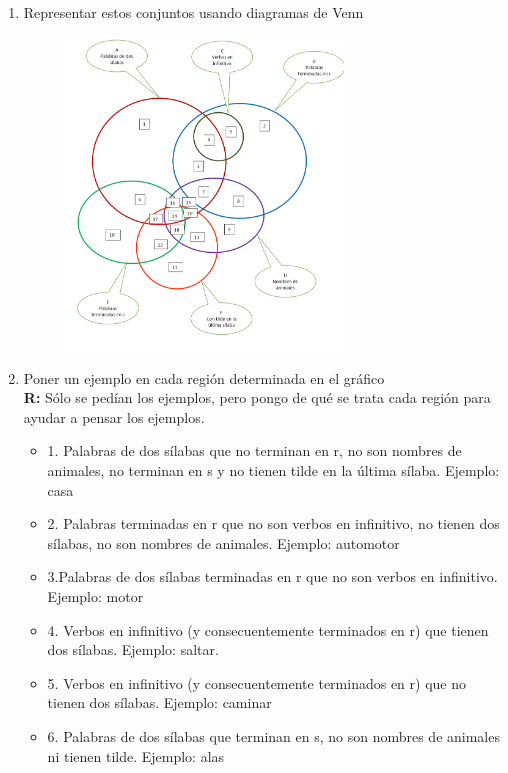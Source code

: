 \documentclass[12pt]{article}
\theoremstyle{definition}
\theoremstyle{remark}
\begin{document}
\begin{enumerate}
	\item Representar estos conjuntos usando diagramas de Venn\\
		\begin{figure}[H]
		\centering
		\includegraphics[width=0.7\textwidth]{bonus.png}
		\end{figure}
	\item Poner un ejemplo en cada región determinada en el gráfico\\
	\textbf{R:} Sólo se pedían los ejemplos, pero pongo de qué se trata cada región para ayudar a pensar los ejemplos.
		\begin{itemize}
		\item 1. Palabras de dos sílabas que no terminan en r, no son nombres de animales, no terminan en s y no tienen tilde en la última sílaba. Ejemplo: casa
		\item 2. Palabras terminadas en r que no son verbos en infinitivo, no tienen dos sílabas, no son nombres de animales. Ejemplo: automotor
		\item  3.Palabras de dos sílabas terminadas en r que no son verbos en infinitivo. Ejemplo: motor
		\item  4. Verbos en infinitivo (y consecuentemente terminados en r) que tienen dos sílabas. Ejemplo: saltar.
		\item  5. Verbos en infinitivo (y consecuentemente terminados en r) que no tienen dos sílabas. Ejemplo: caminar
		\item  6. Palabras de dos sílabas que terminan en s, no son nombres de animales ni tienen tilde. Ejemplo: alas

\end{itemize}
\end{enumerate}
\end{document}
